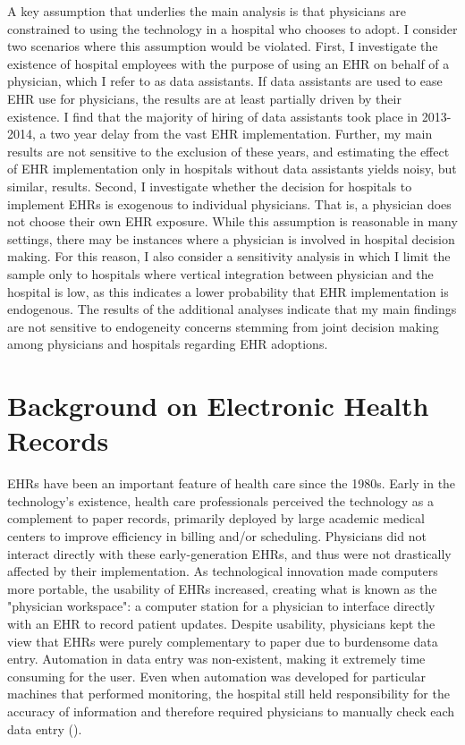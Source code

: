 \documentclass[11pt]{article}
\begin{document}
A key assumption that underlies the main analysis is that physicians are constrained to using the technology in a hospital who chooses to adopt. I consider two scenarios where this assumption would be violated. First, I investigate the existence of hospital employees with the purpose of using an EHR on behalf of a physician, which I refer to as data assistants. If data assistants are used to ease EHR use for physicians, the results are at least partially driven by their existence. I find that the majority of hiring of data assistants took place in 2013-2014, a two year delay from the vast EHR implementation. Further, my main results are not sensitive to the exclusion of these years, and estimating the effect of EHR implementation only in hospitals without data assistants yields noisy, but similar, results. Second, I investigate whether the decision for hospitals to implement EHRs is exogenous to individual physicians. That is, a physician does not choose their own EHR exposure. While this assumption is reasonable in many settings, there may be instances where a physician is involved in hospital decision making. For this reason, I also consider a sensitivity analysis in which I limit the sample only to hospitals where vertical integration between physician and the hospital is low, as this indicates a lower probability that EHR implementation is endogenous. The results of the additional analyses indicate that my main findings are not sensitive to endogeneity concerns stemming from joint decision making among physicians and hospitals regarding EHR adoptions.







\section{Background on Electronic Health Records}

EHRs have been an important feature of health care since the 1980s. Early in the technology's existence, health care professionals perceived the technology as a complement to paper records, primarily deployed by large academic medical centers to improve efficiency in billing and/or scheduling. Physicians did not interact directly with these early-generation EHRs, and thus were not drastically affected by their implementation. As technological innovation made computers more portable, the usability of EHRs increased, creating what is known as the "physician workspace": a computer station for a physician to interface directly with an EHR to record patient updates. Despite usability, physicians kept the view that EHRs were purely complementary to paper due to burdensome data entry. Automation in data entry was non-existent, making it extremely time consuming for the user. Even when automation was developed for particular machines that performed monitoring, the hospital still held responsibility for the accuracy of information and therefore required physicians to manually check each data entry (\cite{evans2016electronic}). 
\end{document}
